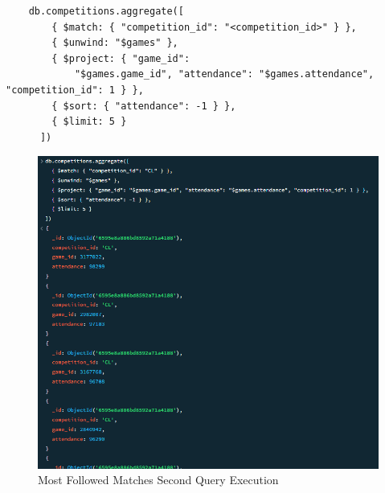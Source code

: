 \documentclass{Configuration_Files/PoliMi3i_thesis}
\begin{document}
\begin{verbatim}
    db.competitions.aggregate([
        { $match: { "competition_id": "<competition_id>" } },
        { $unwind: "$games" },
        { $project: { "game_id": 
            "$games.game_id", "attendance": "$games.attendance", "competition_id": 1 } },
        { $sort: { "attendance": -1 } },
        { $limit: 5 }
      ])           
\end{verbatim}
\begin{figure}[htbp]
    \centering
    \includegraphics[scale=1]{Images/Queries/Competitions/most_followed_games/mfgcl.png}
    \caption{Most Followed Matches Second Query Execution}
\end{figure}
\end{document}
